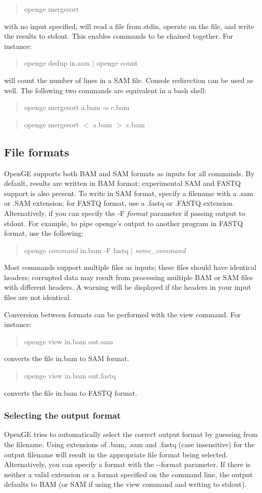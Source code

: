 \documentclass[11pt]{article}
\newcommand {\cmd}[1] {\begin{quote}#1\end{quote}}
\begin{document}
\cmd{openge mergesort}

with no input specified, will read a file from stdin, operate on the file, and write the results to stdout. This enables commands to be chained together. For instance:

\cmd{openge dedup in.sam $|$ openge count}

will count the number of lines in a SAM file. Console redirection can be used as well. The following two commands are equivalent in a bash shell:

\cmd{openge mergesort a.bam -o c.bam}
\cmd{openge mergesort $<$ a.bam $>$ c.bam}

\subsection {File formats}

OpenGE supports both BAM and SAM formats as inputs for all commands. By default, results are written in BAM format; experimental SAM and FASTQ support is also present. To write in SAM format, specify a filename with a .sam or .SAM extension; for FASTQ format, use a .fastq or .FASTQ extension. Alternatively, if you can specify the -F \textit{format} parameter if passing output to stdout. For example, to pipe openge's output to another program in FASTQ format, use the following:

\cmd{openge \textit{command} in.bam -F fastq | \textit{some\_command}}

Most commands support multiple files as inputs; these files should have identical headers; corrupted data may result from processing multiple BAM or SAM files with different headers. A warning will be displayed if the headers in your input files are not identical.

Conversion between formats can be performed with the view command. For instance:
\cmd{openge view in.bam out.sam}
converts the file in.bam to SAM format.

\cmd{openge view in.bam out.fastq}
converts the file in.bam to FASTQ format.

\subsubsection {Selecting the output format}
OpenGE tries to automatically select the correct output format by guessing from the filename. Using extensions of .bam, .sam and .fastq (case insensitive) for the output filename will result in the appropriate file format being selected. Alternatively, you can specify a format with the {-}{-}format parameter. If there is neither a valid extension or a format specified on the command line, the output defaults to BAM (or SAM if using the view command and writing to stdout).
\end{document}
